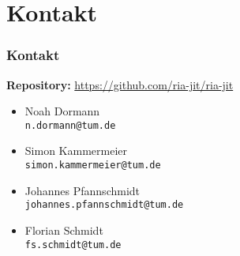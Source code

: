 \documentclass[aspectratio=169, sectionpage=false, german]{tumbeamer}
\newcommand{\blueverb}[1]{{\color{TUMBlue} \texttt{#1}}}
\begin{document}
\section{Kontakt}
\begin{frame}[c]
	\frametitle{Kontakt}
	\textbf{Repository:}\hspace{0.25cm} {\color{TUMBlue}\url{https://github.com/ria-jit/ria-jit}}
	
	\vspace{0.75cm}
	
	\begin{itemize}
		\item Noah Dormann\\\blueverb{n.dormann@tum.de}
		\item Simon Kammermeier\\\blueverb{simon.kammermeier@tum.de}
		\item Johannes Pfannschmidt\\\blueverb{johannes.pfannschmidt@tum.de}
		\item Florian Schmidt\\\blueverb{fs.schmidt@tum.de}
	\end{itemize}
\end{frame}
\end{document}
